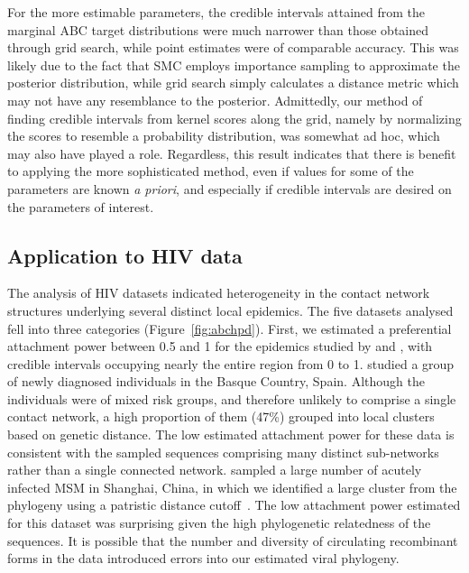 For the more estimable parameters, the credible intervals attained from the
marginal \gls{ABC} target distributions were much narrower than those obtained
through grid search, while point estimates were of comparable accuracy. This
was likely due to the fact that \gls{SMC} employs importance sampling to
approximate the posterior distribution, while grid search simply calculates a
distance metric which may not have any resemblance to the posterior.
Admittedly, our method of finding credible intervals from kernel scores along
the grid, namely by normalizing the scores to resemble a probability
distribution, was somewhat ad hoc, which may also have played a role.
Regardless, this result indicates that there is benefit to applying the more
sophisticated method, even if values for some of the parameters are known
\textit{a priori}, and especially if credible intervals are desired on the
parameters of interest.

\subsection{Application to HIV data}

The analysis of \gls{HIV} datasets indicated heterogeneity in the contact
network structures underlying several distinct local epidemics. The five
datasets analysed fell into three categories (Figure~\ref{fig:abchpd}). First,
we estimated a preferential attachment power between 0.5 and 1 for the
epidemics studied by \textcite{cuevas2009hiv} and \textcite{li2015hiv}, with
credible intervals occupying nearly the entire region from 0 to 1.
\citeauthor{cuevas2009hiv} studied a group of newly diagnosed individuals in
the Basque Country, Spain. Although the individuals were of mixed risk groups,
and therefore unlikely to comprise a single contact network, a high proportion
of them (47\%) grouped into local clusters based on genetic distance. The low
estimated attachment power for these data is consistent with the sampled
sequences comprising many distinct sub-networks rather than a single connected
network. \citeauthor{li2015hiv} sampled a large number of acutely infected MSM
in Shanghai, China, in which we identified a large cluster from the phylogeny
using a patristic distance cutoff~\autocite{poon2015impact}. The low attachment
power estimated for this dataset was surprising given the high phylogenetic
relatedness of the sequences. It is possible that the number and diversity of
circulating recombinant forms in the data introduced errors into our estimated
viral phylogeny.

